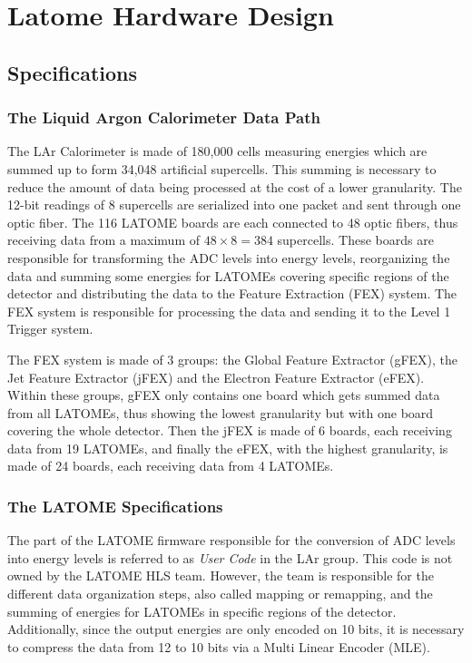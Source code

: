 \chapter{Latome Hardware Design}\label{ch:latome-firmware}

\section{Specifications}\label{sec:specifications}
\subsection{The Liquid Argon Calorimeter Data Path}\label{sec:lar}
The LAr Calorimeter is made of 180,000 cells measuring energies which are summed up to form 34,048 artificial supercells. This summing is necessary to reduce the amount of data being processed at the cost of a lower granularity. The 12-bit readings of 8 supercells are serialized into one packet and sent through one optic fiber. The 116 LATOME boards are each connected to 48 optic fibers, thus receiving data from a maximum of \(48\times8=384\) supercells. These boards are responsible for transforming the ADC levels into energy levels, reorganizing the data and summing some energies for LATOMEs covering specific regions of the detector and distributing the data to the Feature Extraction (FEX) system. The FEX system is responsible for processing the data and sending it to the Level 1 Trigger system.

The FEX system is made of 3 groups: the Global Feature Extractor (gFEX), the Jet Feature Extractor (jFEX) and the Electron Feature Extractor (eFEX). Within these groups, gFEX only contains one board which gets summed data from all LATOMEs, thus showing the lowest granularity but with one board covering the whole detector. Then the jFEX is made of 6 boards, each receiving data from 19 LATOMEs, and finally the eFEX, with the highest granularity, is made of 24 boards, each receiving data from 4 LATOMEs.

\subsection{The LATOME Specifications}\label{sec:latome-specifications}
The part of the LATOME firmware responsible for the conversion of ADC levels into energy levels is referred to as \textit{User Code} in the LAr group. This code is not owned by the LATOME HLS team. However, the team is responsible for the different data organization steps, also called mapping or remapping, and the summing of energies for LATOMEs in specific regions of the detector. Additionally, since the output energies are only encoded on 10 bits, it is necessary to compress the data from 12 to 10 bits via a Multi Linear Encoder (MLE).

